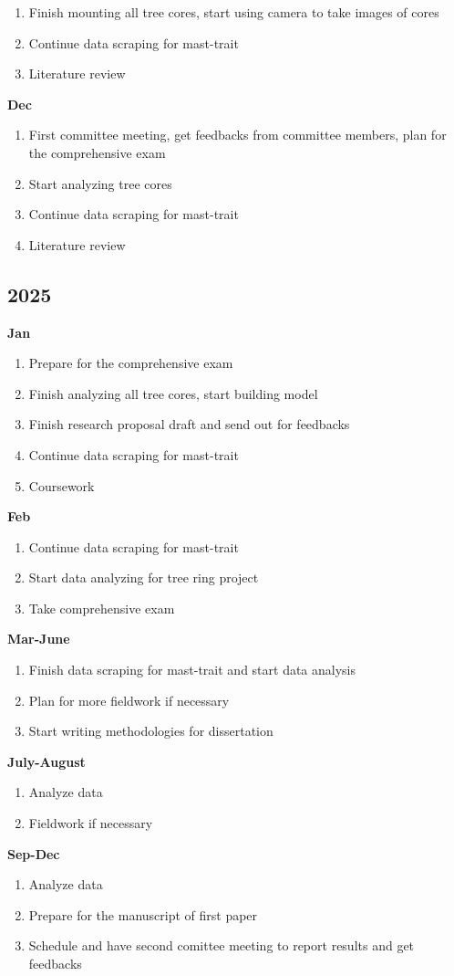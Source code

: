 \documentclass[12pt,letter]{article}
\begin{document}
\begin{multicols}{2}
\begin{enumerate}
	\item Finish mounting all tree cores, start using camera to take images of cores
	\item Continue data scraping for mast-trait
	\item Literature review
	\end{enumerate}	
\textbf{Dec}	
\begin{enumerate}
	\item First committee meeting, get feedbacks from committee members, plan for the comprehensive exam
	\item Start analyzing tree cores
	\item Continue data scraping for mast-trait
	\item Literature review
	\end{enumerate}	
\subsection{2025}
\textbf{Jan}
\begin{enumerate}
	\item Prepare for the comprehensive exam
	\item Finish analyzing all tree cores, start building model
	\item Finish research proposal draft and send out for feedbacks
	\item Continue data scraping for mast-trait
	\item Coursework
	\end{enumerate}
\textbf{Feb}
\begin{enumerate}
	\item Continue data scraping for mast-trait
	\item Start data analyzing for tree ring project
	\item Take comprehensive exam
	\end{enumerate}	
\textbf{Mar-June}
\begin{enumerate}
	\item Finish data scraping for mast-trait and start data analysis
	\item Plan for more fieldwork if necessary
	\item Start writing methodologies for dissertation
	\end{enumerate}	
\textbf{July-August}
\begin{enumerate}
	\item Analyze data
	\item Fieldwork if necessary
	\end{enumerate}	
\textbf{Sep-Dec}
\begin{enumerate}
	\item Analyze data
	\item Prepare for the manuscript of first paper
	\item Schedule and have second comittee meeting to report results and get feedbacks
	\end{enumerate}	

\end{multicols}
\end{document}
